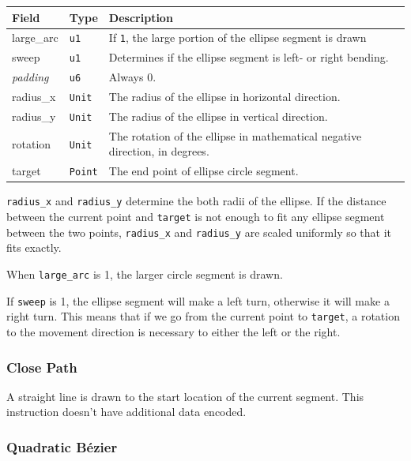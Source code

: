 \documentclass[]{article}
\begin{document}
\begin{longtable}[]{@{}p{1in}p{0.5in}p{4.5in}@{}}
\toprule
Field & Type & Description \\
\midrule
\endhead
large\_arc & \texttt{u1} & If \texttt{1}, the large portion of the ellipse segment is drawn \\
sweep & \texttt{u1} & Determines if the ellipse segment is left- or right bending. \\
\emph{padding} & \texttt{u6} & Always 0. \\
radius\_x & \texttt{Unit} & The radius of the ellipse in horizontal direction. \\
radius\_y & \texttt{Unit} & The radius of the ellipse in vertical direction. \\
rotation & \texttt{Unit} & The rotation of the ellipse in mathematical negative direction, in degrees. \\
target & \texttt{Point} & The end point of ellipse circle segment. \\
\bottomrule
\end{longtable}

\texttt{radius\_x} and \texttt{radius\_y} determine the both radii of
the ellipse. If the distance between the current point and
\texttt{target} is not enough to fit any ellipse segment between the two
points, \texttt{radius\_x} and \texttt{radius\_y} are scaled uniformly
so that it fits exactly.

When \texttt{large\_arc} is 1, the larger circle segment is drawn.

If \texttt{sweep} is 1, the ellipse segment will make a left turn,
otherwise it will make a right turn. This means that if we go from the
current point to \texttt{target}, a rotation to the movement direction
is necessary to either the left or the right.

\hypertarget{close-path}{\subsubsection{Close Path}\label{close-path}}

A straight line is drawn to the start location of the current segment.
This instruction doesn't have additional data encoded.

\hypertarget{quadratic-bezier}{%
\subsubsection{Quadratic Bézier}\label{quadratic-bezier}}
\end{document}

